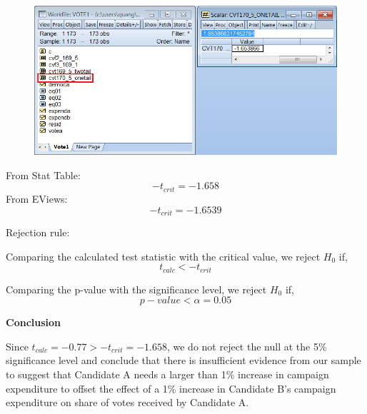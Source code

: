 \documentclass[12pt]{report}
\begin{document}
\vspace{-\baselineskip}
\begin{figure}[H]
	\centering
	\includegraphics{q1_26}
\end{figure}
\vspace{-\baselineskip}
\noindent From Stat Table:
$$-t_{crit} = -1.658$$
\noindent From EViews:
$$-t_{crit} = -1.6539$$

\noindent Rejection rule: 

\noindent Comparing the calculated test statistic with the critical value, we reject $H_0$ if,
$$t_{calc} < -t_{crit}$$

\noindent Comparing the p-value with the significance level, we reject $H_0$ if,
$$p-value < \alpha = 0.05$$

\newpage
\noindent \textbf{Conclusion}

\noindent Since $t_{calc} =-0.77 > -t_{crit} = -1.658$, we do not reject the null at the 5\% significance level and conclude that there is insufficient evidence from our sample to suggest that Candidate A needs a larger than 1\% increase in campaign expenditure to offset the effect of a 1\% increase in Candidate B’s campaign expenditure on share of votes received by Candidate A.
\end{document}
